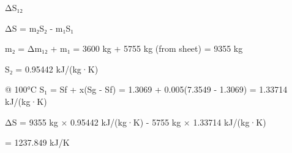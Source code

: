 ΔS₁₂  

ΔS = m₂S₂ - m₁S₁  

m₂ = Δm₁₂ + m₁  
= 3600 kg + 5755 kg  
(from sheet) = 9355 kg  

S₂ = 0.95442 kJ/(kg·K)  

@ 100°C S₁ = Sf + x(Sg - Sf)  
= 1.3069 + 0.005(7.3549 - 1.3069)  
= 1.33714 kJ/(kg·K)  

ΔS = 9355 kg × 0.95442 kJ/(kg·K) - 5755 kg × 1.33714 kJ/(kg·K)  

= 1237.849 kJ/K